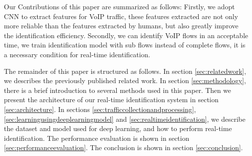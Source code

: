 \documentclass[conference]{IEEEtran}
\begin{document}
Our Contributions of this paper are summarized as follows: Firstly, we adopt CNN to extract features for VoIP traffic, these features extracted are not only more reliable than the features extracted by humans, but also greatly improve the identification efficiency. Secondly, we can identify VoIP flows in an acceptable time, we train identification model with sub flows instead of complete flows, it is a necessary condition for real-time identification.




The remainder of this paper is structured as follows. In section \ref{sec:relatedwork}, we describes the previously published related work.  In section \ref{sec:methodology}, there is a brief introduction to several methods used in this paper. Then we present the architecture of our real-time identification system in section \ref{sec:architecture}. In sections \ref{sec:trafficcollectionandprocessing}, \ref{sec:learningusingdeeplearningmodel} and \ref{sec:realtimeidentification}, we describe the dataset and model used for deep learning, and how to perform real-time identification. The performance evaluation is shown in section \ref{sec:performanceevaluation}. The conclusion is shown in section \ref{sec:conclusion}.
\end{document}
